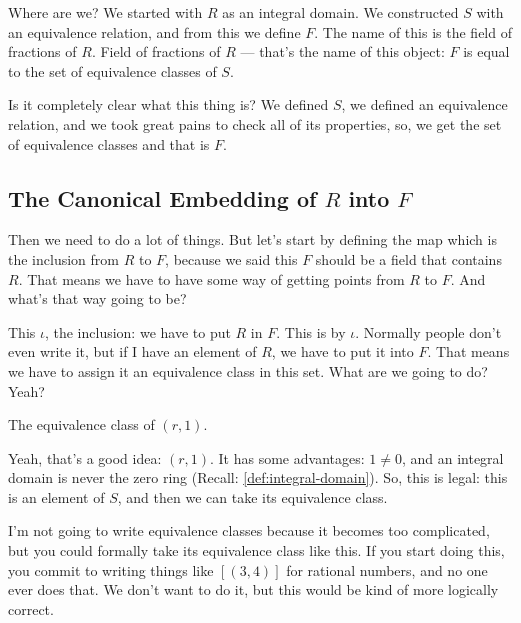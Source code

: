 \begin{speech}[00:51:06 - 00:52:35]
Where are we? We started with $R$ as an integral domain.  We constructed $S$ with an equivalence relation,  and from this we define $F$. The name of this is the field of fractions of $R$.  Field of fractions of $R$ --- that's the name of this object: $F$ is equal to the set of equivalence classes of $S$. 

Is it completely clear what this thing is? We defined $S$, we defined an equivalence relation, and we took great pains to check all of its properties, so, we get the set of equivalence classes and that is $F$.
\end{speech}

\subsection{The Canonical Embedding of \texorpdfstring{$R$}{R} into \texorpdfstring{$F$}{F}}

\begin{speech}[00:52:35 - 00:53:14]
Then we need to do a lot of things. But let's start by defining the map which is the inclusion from $R$ to $F$,  because we said this $F$ should be a field that contains $R$. That means we have to have some way of getting points from $R$ to $F$. And what's that way going to be?

This $\iota$, the inclusion: we have to put $R$ in $F$.  This is by $\iota$. Normally people don't even write it, but if I have an element of $R$, we have to put it into $F$. That means we have to assign it an equivalence class in this set. What are we going to do? Yeah?
\end{speech}

\begin{student}
The equivalence class of $(r, 1)$.
\end{student}

\begin{speech}[00:53:15 - 00:54:22]
Yeah, that's a good idea: $(r, 1)$.  It has some advantages: $1 \neq 0$, and an integral domain is never the zero ring (Recall: \cref{def:integral-domain}). So, this is legal: this is an element of $S$, and then we can take its equivalence class.

I'm not going to write equivalence classes because it becomes too complicated, but you could formally take its equivalence class like this. If you start doing this, you commit to writing things like $[(3, 4)]$ for rational numbers, and no one ever does that. We don't want to do it, but this would be kind of more logically correct.
\end{speech}

